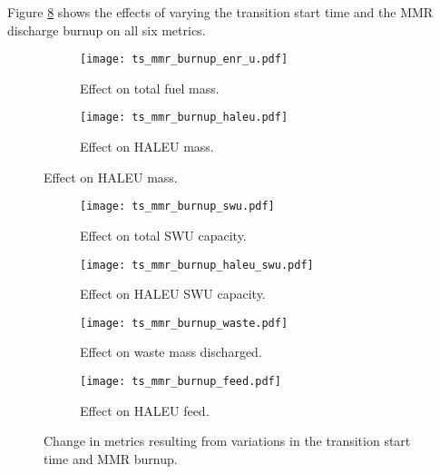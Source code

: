 Figure \ref{fig:ts_mmr_bu} shows the effects of varying the transition 
start time and the \gls{MMR} discharge burnup on all six metrics. 

\begin{figure}
    \begin{subfigure}[t]{0.48\textwidth}
        \centering
        \texttt{[image: ts\_mmr\_burnup\_enr\_u.pdf]}
        \caption{Effect on total fuel mass.}
        \label{fig:ts_mmr_bu_enr_u}
    \end{subfigure}
    \hfill
    \begin{subfigure}[t]{0.48\textwidth}
        \centering
        \texttt{[image: ts\_mmr\_burnup\_haleu.pdf]}
        \caption{Effect on HALEU mass.}
        \label{fig:ts_mmr_bu_haleu}
    \end{subfigure}
\end{figure}

\begin{figure}
    \ContinuedFloat    
    \begin{subfigure}[t]{0.48\textwidth}
        \centering
        \texttt{[image: ts\_mmr\_burnup\_swu.pdf]}
        \caption{Effect on total SWU capacity.}
        \label{fig:ts_mmr_bu_swu}
    \end{subfigure}
    \hfill
    \begin{subfigure}[t]{0.48\textwidth}
        \centering
        \texttt{[image: ts\_mmr\_burnup\_haleu\_swu.pdf]}
        \caption{Effect on HALEU SWU capacity.}
        \label{fig:ts_mmr_bu_haleu_swu}
    \end{subfigure}
    
    \begin{subfigure}[t]{0.48\textwidth}
        \centering
        \texttt{[image: ts\_mmr\_burnup\_waste.pdf]}
        \caption{Effect on waste mass discharged.}
        \label{fig:ts_mmr_bu_waste}
    \end{subfigure}
    \hfill
    \begin{subfigure}[t]{0.48\textwidth}
        \centering
        \texttt{[image: ts\_mmr\_burnup\_feed.pdf]}
        \caption{Effect on HALEU feed.}
        \label{fig:ts_mmr_bu_feed}
    \end{subfigure}
    \caption{Change in metrics resulting from variations in the 
    transition start time and MMR burnup.}
    \label{fig:ts_mmr_bu}
\end{figure}

